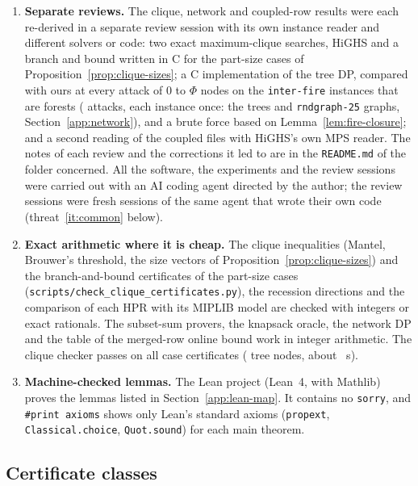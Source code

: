 \begin{enumerate}
\item \textbf{Separate reviews.} The clique, network and coupled-row
results were each re-derived in a separate review session with its own instance
reader and different solvers or code: two exact maximum-clique searches,
HiGHS and a branch and bound written in C for the part-size cases of
Proposition~\ref{prop:clique-sizes}; a C implementation of the tree DP,
compared with ours at every attack of $0$ to $\Phi$ nodes on the
\SuppNetForests{} \texttt{inter-fire} instances that are forests
(\SuppNetForestAttacks{} attacks, each instance once: the \SuppNetTrees{}
trees and \SuppNetRndForests{} \texttt{rndgraph-25} graphs,
Section~\ref{app:network}), and a brute force based on
Lemma~\ref{lem:fire-closure}; and a second reading of the coupled files with HiGHS's
own MPS reader. The notes of each review and the corrections it led to are in
the \texttt{README.md} of the folder concerned. All the software, the
experiments and the review sessions were carried out with an AI coding agent
directed by the author; the review sessions were fresh sessions of the same
agent that wrote their own code (threat~\ref{it:common} below).

\item \textbf{Exact arithmetic where it is cheap.} The clique inequalities
(Mantel, Brouwer's threshold, the size vectors of
Proposition~\ref{prop:clique-sizes}) and the branch-and-bound certificates of
the part-size cases (\texttt{scripts/check\_clique\_certificates.py}), the
recession directions and the comparison of each HPR with its MIPLIB model are
checked with integers or exact rationals. The subset-sum provers, the
knapsack oracle, the network DP and the table of the merged-row online bound
work in integer arithmetic. The clique checker passes on all
\CliqueCertCases{} case certificates (\CliqueCertNodes{} tree nodes, about
\CliqueCertSeconds{}~s).

\item \textbf{Machine-checked lemmas.} The Lean project (Lean~4,\cite{moura2021lean} with Mathlib\cite{mathlib2020})
proves the lemmas listed in Section~\ref{app:lean-map}. It contains no
\texttt{sorry}, and \texttt{\#print axioms} shows only Lean's standard axioms
(\texttt{propext}, \texttt{Classical.choice}, \texttt{Quot.sound}) for each
main theorem.
\end{enumerate}

\subsection{Certificate classes}\label{app:classes}

